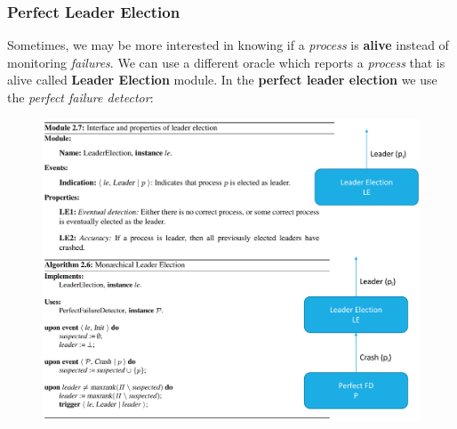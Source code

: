 \documentclass{article}
\begin{document}
\subsubsection{Perfect Leader Election}
Sometimes, we may be more interested in knowing if a \emph{process} is \textbf{alive} instead of monitoring \emph{failures}. We can use a different oracle which reports a \emph{process} that is alive called \textbf{Leader Election} module. In the \textbf{perfect leader election} we use the \emph{perfect failure detector}:
\begin{figure}[H]
  \centering
  \includegraphics[scale=0.5, left]{cattura21.png}
\end{figure}
\end{document}
